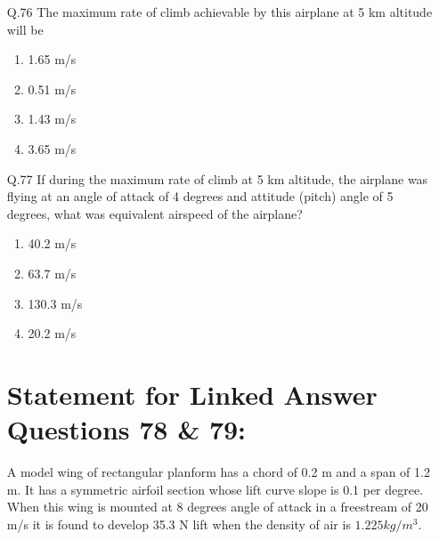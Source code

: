 \documentclass[journal]{IEEEtran}
\begin{document}
\begin{enumerate}

\item[Q.76] The maximum rate of climb achievable by this airplane at 5 km altitude will be

\begin{enumerate}
    \item 1.65 m/s
    \item 0.51 m/s
    \item 1.43 m/s
    \item 3.65 m/s\\
\end{enumerate}

\item[Q.77] If during the maximum rate of climb at 5 km altitude, the airplane was flying at an angle of attack of 4 degrees and attitude (pitch) angle of 5 degrees, what was equivalent airspeed of the airplane?

\begin{enumerate}
    \item  40.2 m/s
    \item  63.7 m/s
    \item  130.3 m/s
    \item  20.2 m/s\\
\end{enumerate}

\section*{Statement for Linked Answer Questions 78 \& 79:}
A model wing of rectangular planform has a chord of 0.2 m and a span of 1.2 m. It has a symmetric airfoil section whose lift curve slope is 0.1 per degree. When this wing is mounted at 8 degrees angle of attack in a freestream of 20 m/s it is found to develop 35.3 N lift when the density of air is $1.225 kg/m^3$.\\


\end{enumerate}
\end{document}
